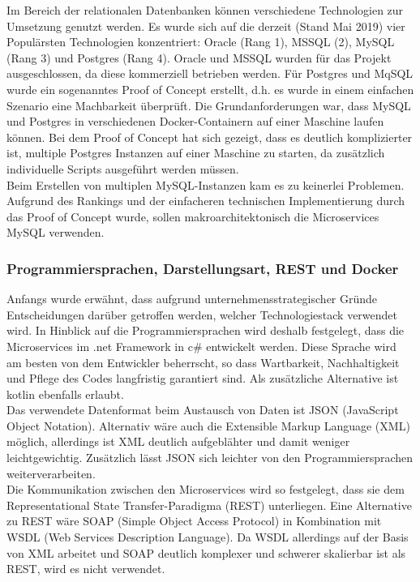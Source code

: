 {Im Bereich der relationalen Datenbanken können verschiedene Technologien zur Umsetzung genutzt werden. Es wurde sich auf die derzeit (Stand Mai 2019) vier Populärsten Technologien konzentriert: Oracle (Rang 1), MSSQL (2), MySQL (Rang 3) und Postgres (Rang 4).\cite{dbengines2019ranking}  Oracle und MSSQL wurden für das Projekt ausgeschlossen, da diese kommerziell betrieben werden. Für Postgres und MqSQL wurde ein sogenanntes Proof of Concept erstellt, d.h. es wurde in einem einfachen Szenario eine Machbarkeit überprüft. Die Grundanforderungen war, dass MySQL und Postgres in verschiedenen Docker-Containern auf einer Maschine laufen können. Bei dem Proof of Concept hat sich gezeigt, dass es deutlich komplizierter ist, multiple Postgres Instanzen auf einer Maschine zu starten, da zusätzlich individuelle Scripts ausgeführt werden müssen.\cite{postgres2016}\\

Beim Erstellen von multiplen MySQL-Instanzen kam es zu keinerlei Problemen. Aufgrund des Rankings und der einfacheren technischen Implementierung durch das Proof of Concept wurde, sollen makroarchitektonisch die Microservices MySQL verwenden.

\subsubsection{Programmiersprachen, Darstellungsart, REST und Docker}
Anfangs wurde erwähnt, dass aufgrund unternehmensstrategischer Gründe Entscheidungen darüber getroffen werden, welcher Technologiestack verwendet wird. In Hinblick auf die Programmiersprachen wird deshalb festgelegt, dass die Microservices im .net Framework in c\# entwickelt werden. Diese Sprache wird am besten von dem Entwickler beherrscht, so dass Wartbarkeit, Nachhaltigkeit und Pflege des Codes langfristig garantiert sind. Als zusätzliche Alternative ist kotlin ebenfalls erlaubt.\\

Das verwendete Datenformat beim Austausch von Daten ist JSON (JavaScript Object Notation). Alternativ wäre auch die Extensible Markup Language (XML) möglich, allerdings ist XML deutlich aufgeblähter und damit weniger leichtgewichtig. Zusätzlich lässt JSON sich leichter von den Programmiersprachen weiterverarbeiten.\cite{jsonxml2006heise}\\

Die Kommunikation zwischen den Microservices wird so festgelegt, dass sie dem Representational State Transfer-Paradigma (REST) unterliegen. Eine Alternative zu REST wäre SOAP (Simple Object Access Protocol) in Kombination mit WSDL (Web Services Description Language). Da WSDL allerdings auf der Basis von XML arbeitet und SOAP deutlich komplexer und schwerer skalierbar ist als REST, wird es nicht verwendet. \cite{ayadi2008rest_vs_soap}\\ 

}
